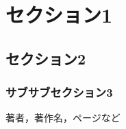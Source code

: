 \documentclass[12pt,a4paper]{jsarticle}
\begin{document}
\section{セクション1}
\subsection{セクション2}
\subsubsection{サブサブセクション3}


\begin{thebibliography}{9}%
		 著者，著作名，ページなど　%
	\end{thebibliography}%
\end{document}
